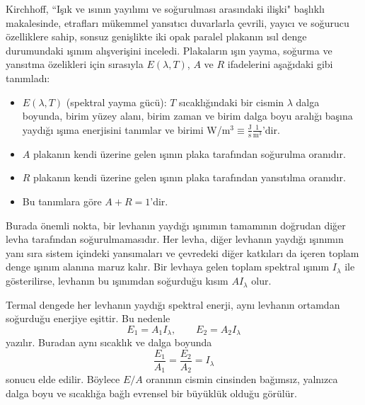 \documentclass[00_kitap.tex]{subfiles}
\begin{document}
Kirchhoff, ``Işık ve ısının yayılımı ve soğurulması arasındaki ilişki" \cite{book:Jammer, Kirchhoff1859} başlıklı makalesinde, etrafları mükemmel yansıtıcı duvarlarla çevrili, yayıcı ve soğurucu özelliklere sahip, sonsuz genişlikte iki opak paralel plakanın ısıl denge durumundaki ışınım alışverişini inceledi. Plakaların ışın yayma, soğurma ve yansıtma özelikleri için sırasıyla $E(\lambda, T)$, $A$ ve $R$ ifadelerini aşağıdaki gibi tanımladı:

\begin{itemize}
\item $E(\lambda, T)$ (spektral yayma gücü): $T$ sıcaklığındaki bir cismin $\lambda$ dalga boyunda, birim yüzey alanı, birim zaman ve birim dalga boyu aralığı başına yaydığı ışıma enerjisini tanımlar ve birimi W/m$^3\equiv \frac{\text{J}}{\text{s}} \frac{1}{\text{m}^3}$'dir.
\item $A$ plakanın kendi üzerine gelen ışının plaka tarafından soğurulma oranıdır.
\item $R$ plakanın kendi üzerine gelen ışının plaka tarafından yansıtılma  oranıdır.
\item Bu tanımlara göre $A + R = 1$'dir.
\end{itemize}


Burada önemli nokta, bir levhanın yaydığı ışınımın tamamının doğrudan diğer levha tarafından soğurulmamasıdır. Her levha, diğer levhanın yaydığı ışınımın yanı sıra sistem içindeki yansımaları ve çevredeki diğer katkıları da içeren toplam denge ışınım alanına maruz kalır. Bir levhaya gelen toplam spektral ışınım $I_\lambda$ ile gösterilirse, levhanın bu ışınımdan soğurduğu kısım $A I_\lambda$ olur.

Termal dengede her levhanın yaydığı spektral enerji, aynı levhanın ortamdan soğurduğu enerjiye eşittir. Bu nedenle
\begin{equation}
	E_1 = A_1 I_\lambda,
	\qquad
	E_2 = A_2 I_\lambda
\end{equation}
yazılır. Buradan aynı sıcaklık ve dalga boyunda
\begin{equation}
	\frac{E_1}{A_1}
	=
	\frac{E_2}{A_2}
	=
	I_\lambda
\end{equation}
sonucu elde edilir. Böylece $E/A$ oranının cismin cinsinden bağımsız, yalnızca dalga boyu ve sıcaklığa bağlı evrensel bir büyüklük olduğu görülür.
\end{document}
